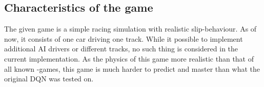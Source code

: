 %
%


\subsection{Characteristics of the game}



The given game is a simple racing simulation with realistic slip-behaviour. As of now, it consists of one car driving one track. While it possible to implement additional AI drivers or different tracks, no such thing is considered in the current implementation. As the physics of this game more realistic than that of all known -games, this game is much harder to predict and master than what the original DQN was tested on.

